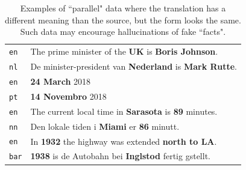 \begin{table}[!h]
    \small
    \centering
    \begin{tabular}{ll}
        \toprule

        \texttt{en}  & The prime minister of the \textbf{UK} is \textbf{Boris Johnson}.     \\
        \texttt{nl}  & De minister-president van \textbf{Nederland} is \textbf{Mark Rutte}. \\
        \hdashline
        \texttt{en}  & \textbf{24 March} 2018                                               \\
        \texttt{pt}  & \textbf{14 Novembro} 2018                                            \\
        \hdashline
        \texttt{en}  & The current local time in \textbf{Sarasota} is \textbf{89} minutes.  \\
        \texttt{nn}  & Den lokale tiden i \textbf{Miami} er \textbf{86} minutt.             \\
        \hdashline
        \texttt{en}  & In \textbf{1932} the highway was extended \textbf{north to LA}.      \\
        \texttt{bar} & \textbf{1938} is de Autobahn bei \textbf{Inglstod} fertig gstellt.   \\
        \bottomrule
    \end{tabular}
    \caption{Examples of ``parallel" data where the translation has a different meaning than the source, but the form looks the same. Such data may encourage hallucinations of fake ``facts".}
    \label{tab:not_actually_parallel}
\end{table}

